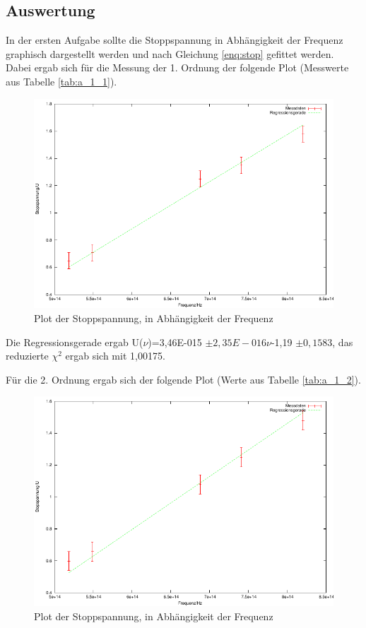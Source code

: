 \documentclass[12px]{scrartcl}
\begin{document}
\newpage
\subsection{Auswertung}
In der ersten Aufgabe sollte die Stoppspannung in Abhängigkeit der Frequenz graphisch dargestellt werden und nach Gleichung \ref{enq:stop} gefittet werden. Dabei ergab sich für die Messung der 1. Ordnung der folgende Plot (Messwerte aus Tabelle \ref{tab:a_1_1}).

\begin{figure}[H]
\centering
    \includegraphics[scale = 1]{a_1_1.pdf}
  	\caption[Plot der Stoppspannung, in Abhängigkeit der Frequenz]{Plot der Stoppspannung, in Abhängigkeit der Frequenz}
  \label{fig:a_3_A}
\end{figure}

Die Regressionsgerade ergab U($\nu$)=3,46E-015 $\pm 2,35E-016 \nu$-1,19 $\pm 0,1583$, das reduzierte $\chi^2$ ergab sich mit 1,00175.

\newpage
Für die 2. Ordnung ergab sich der folgende Plot (Werte aus Tabelle \ref{tab:a_1_2}).

\begin{figure}[H]
\centering
    \includegraphics[scale = 1]{a_1_2.pdf}
  	\caption[Plot der Stoppspannung, in Abhängigkeit der Frequenz]{Plot der Stoppspannung, in Abhängigkeit der Frequenz}
  \label{fig:a_3_A}
\end{figure}
\end{document}
